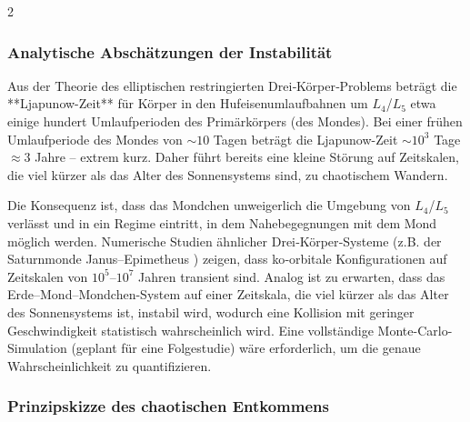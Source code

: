 \documentclass[11pt,a4paper]{article}
\begin{document}
\begin{multicols}{2}
		\subsubsection{Analytische Abschätzungen der Instabilität}
		
		Aus der Theorie des elliptischen restringierten Drei‑Körper‑Problems beträgt die
		**Ljapunow-Zeit** für Körper in den Hufeisenumlaufbahnen um \(L_4\)/\(L_5\)
		etwa einige hundert Umlaufperioden des Primärkörpers (des Mondes).
		Bei einer frühen Umlaufperiode des Mondes von \(\sim 10\) Tagen beträgt die Ljapunow-Zeit
		\(\sim 10^{3}\) Tage \(\approx 3\) Jahre – extrem kurz. Daher führt bereits eine
		kleine Störung auf Zeitskalen, die viel kürzer als das Alter des Sonnensystems sind,
		zu chaotischem Wandern.
		
		Die Konsequenz ist, dass das Mondchen unweigerlich die Umgebung von
		\(L_4\)/\(L_5\) verlässt und in ein Regime eintritt, in dem Nahebegegnungen mit dem Mond
		möglich werden. Numerische Studien ähnlicher Drei‑Körper‑Systeme
		(z.B. der Saturnmonde Janus–Epimetheus \cite{JanusEpimetheus}) zeigen, dass ko‑orbitale Konfigurationen
		auf Zeitskalen von \(10^{5}\)–\(10^{7}\) Jahren transient sind.
		Analog ist zu erwarten, dass das Erde–Mond–Mondchen-System auf einer Zeitskala, die viel kürzer als das Alter des Sonnensystems ist, instabil wird, wodurch eine Kollision mit geringer Geschwindigkeit statistisch wahrscheinlich wird. Eine vollständige Monte-Carlo-Simulation (geplant für eine Folgestudie) wäre erforderlich, um die genaue Wahrscheinlichkeit zu quantifizieren.
		
		\subsubsection{Prinzipskizze des chaotischen Entkommens}
		

\end{multicols}
\end{document}

